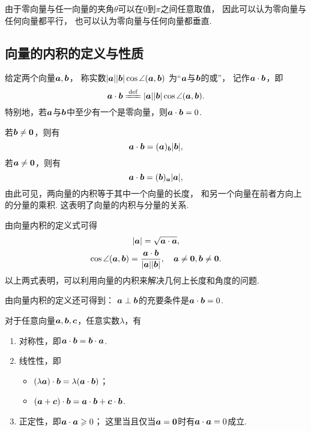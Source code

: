 由于零向量与任一向量的夹角\(\theta\)可以在\(0\)到\(\pi\)之间任意取值，%
因此可以认为零向量与任何向量都平行，%
也可以认为零向量与任何向量都垂直.

\subsection{向量的内积的定义与性质}
\begin{definition}
给定两个向量\(\boldsymbol{a},\boldsymbol{b}\)，
称实数\(\abs{\boldsymbol{a}} \abs{\boldsymbol{b}} \cos\angle(\boldsymbol{a},\boldsymbol{b})\)
为“\(\boldsymbol{a}\)与\(\boldsymbol{b}\)的或”，
记作\(\boldsymbol{a} \cdot \boldsymbol{b}\)，即
\begin{equation}
	\mat{a} \cdot \mat{b}
	\defeq
	\abs{\mat{a}} \abs{\mat{b}} \cos\angle(\mat{a},\mat{b}).
\end{equation}
特别地，若\(\boldsymbol{a}\)与\(\boldsymbol{b}\)中至少有一个是零向量，则\(\boldsymbol{a}\cdot\boldsymbol{b}=0\).
\end{definition}

若\(\boldsymbol{b}\neq\boldsymbol{0}\)，则有
\begin{equation}
	\boldsymbol{a}\cdot\boldsymbol{b}
	= (\boldsymbol{a})_{\boldsymbol{b}} \abs{\boldsymbol{b}},
\end{equation}
若\(\boldsymbol{a}\neq\boldsymbol{0}\)，则有
\begin{equation}
	\boldsymbol{a}\cdot\boldsymbol{b}
	= (\boldsymbol{b})_{\boldsymbol{a}} \abs{\boldsymbol{a}},
\end{equation}
由此可见，两向量的内积等于其中一个向量的长度，
和另一个向量在前者方向上的分量的乘积.
这表明了向量的内积与分量的关系.

由向量内积的定义式可得
\begin{gather}
	\abs{\boldsymbol{a}} = \sqrt{\boldsymbol{a}\cdot\boldsymbol{a}}, \\
	\cos\angle(\boldsymbol{a},\boldsymbol{b}) = \frac{\boldsymbol{a}\cdot\boldsymbol{b}}{\abs{\boldsymbol{a}} \abs{\boldsymbol{b}}},
	\quad \boldsymbol{a}\neq\boldsymbol{0},\boldsymbol{b}\neq\boldsymbol{0}.
\end{gather}
以上两式表明，可以利用向量的内积来解决几何上长度和角度的问题.

由向量内积的定义还可得到：
\(\boldsymbol{a}\perp\boldsymbol{b}\)的充要条件是\(\boldsymbol{a}\cdot\boldsymbol{b}=0\).

\begin{theorem}
对于任意向量\(\boldsymbol{a},\boldsymbol{b},\boldsymbol{c}\)，任意实数\(\lambda\)，有\begin{enumerate}
	\item 对称性，即\(\boldsymbol{a}\cdot\boldsymbol{b} = \boldsymbol{b}\cdot\boldsymbol{a}\).
	\item 线性性，即\begin{itemize}
		\item \((\lambda\boldsymbol{a})\cdot\boldsymbol{b}=\lambda(\boldsymbol{a}\cdot\boldsymbol{b})\)；
		\item \((\boldsymbol{a}+\boldsymbol{c})\cdot\boldsymbol{b}=\boldsymbol{a}\cdot\boldsymbol{b}+\boldsymbol{c}\cdot\boldsymbol{b}\).
	\end{itemize}
	\item 正定性，即\(\boldsymbol{a}\cdot\boldsymbol{a}\geqslant0\)；
	这里当且仅当\(\boldsymbol{a}=\boldsymbol{0}\)时有\(\boldsymbol{a}\cdot\boldsymbol{a}=0\)成立.
\end{enumerate}
\end{theorem}

